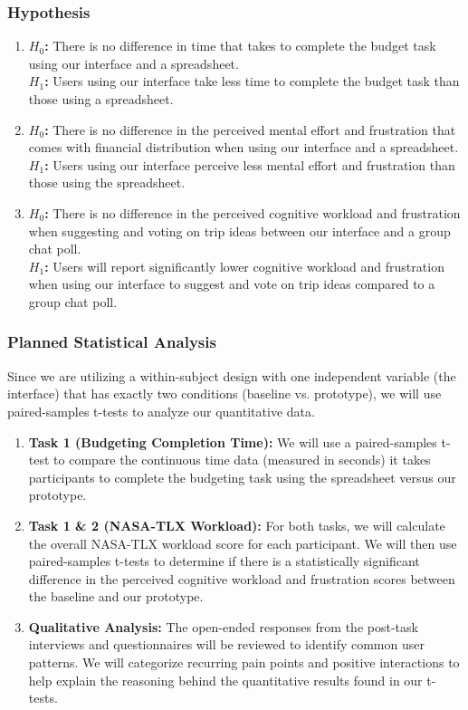 \documentclass[12pt,a4paper]{article}
\begin{document}
\subsubsection{Hypothesis}
\begin{enumerate}
    \item{
    \textbf{$H_0$: } There is no difference in time that takes to complete the budget task using our interface and a spreadsheet.  
    \\
    \textbf{$H_1$: } Users using our interface take less time to complete the budget task than those using a spreadsheet. 
    }
    \item{
    \textbf{$H_0$: } There is no difference in the perceived mental effort and frustration that comes with financial distribution when using our interface and a spreadsheet.
    \\
    \textbf{$H_1$: } Users using our interface perceive less mental effort and frustration than those using the spreadsheet. 
    }
    \item{
    \textbf{$H_0$: } There is no difference in the perceived cognitive workload and frustration when suggesting and voting on trip ideas between our interface and a group chat poll.
    \\
    \textbf{$H_1$: } Users will report significantly lower cognitive workload and frustration when using our interface to suggest and vote on trip ideas compared to a group chat poll.
    }
\end{enumerate}

\subsubsection{Planned Statistical Analysis}
\indent
\par
\indent
Since we are utilizing a within-subject design with one independent variable (the interface) that has exactly two conditions (baseline vs. prototype), we will use paired-samples t-tests to analyze our quantitative data.
\begin{enumerate}
    \item \textbf{Task 1 (Budgeting Completion Time):} We will use a paired-samples t-test to compare the continuous time data (measured in seconds) it takes participants to complete the budgeting task using the spreadsheet versus our prototype.
    \item \textbf{Task 1 \& 2 (NASA-TLX Workload):} For both tasks, we will calculate the overall NASA-TLX workload score for each participant. We will then use paired-samples t-tests to determine if there is a statistically significant difference in the perceived cognitive workload and frustration scores between the baseline and our prototype.
    \item \textbf{Qualitative Analysis:} The open-ended responses from the post-task interviews and questionnaires will be reviewed to identify common user patterns. We will categorize recurring pain points and positive interactions to help explain the reasoning behind the quantitative results found in our t-tests.


\end{enumerate}
\end{document}
